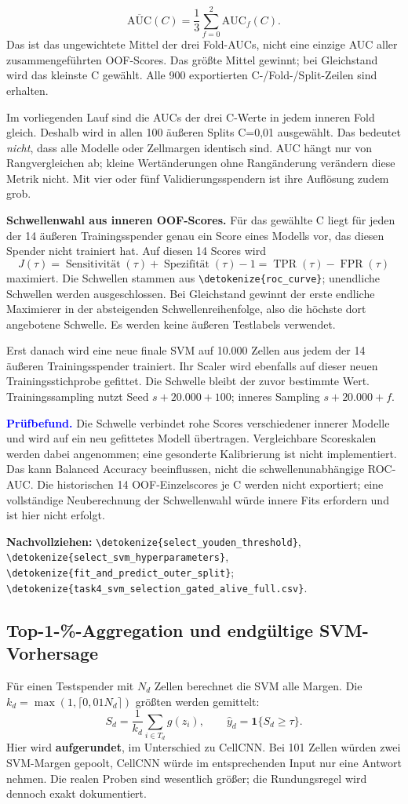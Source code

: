 \documentclass[11pt,a4paper]{article}
\newcommand{\code}[1]{\expandafter\nolinkurl\expandafter{\detokenize{#1}}}
\newcommand{\source}[1]{\par{\footnotesize\raggedright\color{muted}\textbf{Nachvollziehen:} #1\par}}
\newcommand{\finding}[1]{\par\smallskip\noindent\textcolor{blue}{\textbf{Prüfbefund.}} #1\par}
\begin{document}
\[
 \overline{\mathrm{AUC}}(C)=\frac13\sum_{f=0}^2\mathrm{AUC}_f(C).
\]
Das ist das ungewichtete Mittel der drei Fold-AUCs, nicht eine einzige AUC
aller zusammengeführten OOF-Scores. Das größte Mittel gewinnt; bei
Gleichstand wird das kleinste C gewählt. Alle 900 exportierten
C-/Fold-/Split-Zeilen sind erhalten.

Im vorliegenden Lauf sind die AUCs der drei C-Werte in jedem inneren Fold
gleich. Deshalb wird in allen 100 äußeren Splits C=0,01 ausgewählt. Das
bedeutet \emph{nicht}, dass alle Modelle oder Zellmargen identisch sind.
AUC hängt nur von Rangvergleichen ab; kleine Wertänderungen ohne
Rangänderung verändern diese Metrik nicht. Mit vier oder fünf
Validierungsspendern ist ihre Auflösung zudem grob.

\textbf{Schwellenwahl aus inneren OOF-Scores.} Für das gewählte C liegt
für jeden der 14 äußeren Trainingsspender genau ein Score eines Modells
vor, das diesen Spender nicht trainiert hat. Auf diesen 14 Scores wird
\[
 J(\tau)=\operatorname{Sensitivität}(\tau)+
         \operatorname{Spezifität}(\tau)-1
        =\operatorname{TPR}(\tau)-\operatorname{FPR}(\tau)
\]
maximiert. Die Schwellen stammen aus \code{roc_curve}; unendliche
Schwellen werden ausgeschlossen. Bei Gleichstand gewinnt der erste endliche
Maximierer in der absteigenden Schwellenreihenfolge, also die höchste dort
angebotene Schwelle. Es werden keine äußeren Testlabels verwendet.

Erst danach wird eine neue finale SVM auf 10.000 Zellen aus jedem der
14 äußeren Trainingsspender trainiert. Ihr Scaler wird ebenfalls auf
dieser neuen Trainingsstichprobe gefittet. Die Schwelle bleibt der
zuvor bestimmte Wert. Trainingssampling nutzt Seed
\(s+20.000+100\); inneres Sampling \(s+20.000+f\).

\finding{Die Schwelle verbindet rohe Scores verschiedener innerer Modelle
und wird auf ein neu gefittetes Modell übertragen. Vergleichbare
Scoreskalen werden dabei angenommen; eine gesonderte Kalibrierung ist
nicht implementiert. Das kann Balanced Accuracy beeinflussen, nicht die
schwellenunabhängige ROC-AUC. Die historischen 14 OOF-Einzelscores je C
werden nicht exportiert; eine vollständige Neuberechnung der Schwellenwahl
würde innere Fits erfordern und ist hier nicht erfolgt.}
\source{\code{select_youden_threshold}, \code{select_svm_hyperparameters},
\code{fit_and_predict_outer_split}; \code{task4_svm_selection_gated_alive_full.csv}.}

\clearpage
\subsection*{Top-1-\%-Aggregation und endgültige SVM-Vorhersage}
Für einen Testspender mit \(N_d\) Zellen berechnet die SVM alle Margen.
Die \(k_d=\max(1,\lceil0{,}01N_d\rceil)\) größten werden gemittelt:
\[
 S_d=\frac1{k_d}\sum_{i\in T_d}g(z_i),\qquad
 \widehat y_d=\mathbf1\{S_d\ge\tau\}.
\]
Hier wird \textbf{aufgerundet}, im Unterschied zu CellCNN. Bei 101 Zellen
würden zwei SVM-Margen gepoolt, CellCNN würde im entsprechenden Input nur
eine Antwort nehmen. Die realen Proben sind wesentlich größer; die
Rundungsregel wird dennoch exakt dokumentiert.
\end{document}
